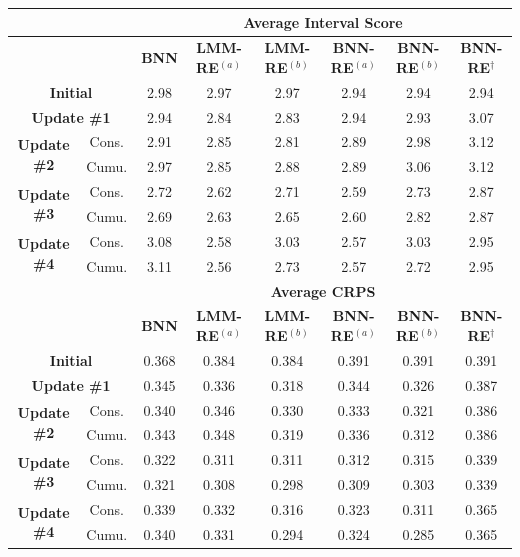 \begin{tabular}{cc|cccccc}
\hline
 & & \multicolumn{6}{c}{\textbf{Average Interval Score}} \\
\hline
 & & \textbf{BNN} & \textbf{LMM-RE}$^{(a)}$ & \textbf{LMM-RE}$^{(b)}$ & \textbf{BNN-RE}$^{(a)}$ & \textbf{BNN-RE}$^{(b)}$ & \textbf{BNN-RE}$^{\dagger}$ \\
\hline
\multicolumn{2}{c|}{\textbf{Initial}} & 2.98 & 2.97 & 2.97 & 2.94 & 2.94 & 2.94 \\
\multicolumn{2}{c|}{\textbf{Update \#1}} & 2.94 & 2.84 & 2.83 & 2.94 & 2.93 & 3.07 \\
\multirow{2}{*}{\textbf{Update \#2}} & Cons. & 2.91 & 2.85 & 2.81 & 2.89 & 2.98 & 3.12 \\
 & Cumu. & 2.97 & 2.85 & 2.88 & 2.89 & 3.06 & 3.12 \\
\multirow{2}{*}{\textbf{Update \#3}} & Cons. & 2.72 & 2.62 & 2.71 & 2.59 & 2.73 & 2.87 \\
 & Cumu. & 2.69 & 2.63 & 2.65 & 2.60 & 2.82 & 2.87 \\
\multirow{2}{*}{\textbf{Update \#4}} & Cons. & 3.08 & 2.58 & 3.03 & 2.57 & 3.03 & 2.95 \\
 & Cumu. & 3.11 & 2.56 & 2.73 & 2.57 & 2.72 & 2.95 \\
\hline
 & & \multicolumn{6}{c}{\textbf{Average CRPS}} \\
\hline
 & & \textbf{BNN} & \textbf{LMM-RE}$^{(a)}$ & \textbf{LMM-RE}$^{(b)}$ & \textbf{BNN-RE}$^{(a)}$ & \textbf{BNN-RE}$^{(b)}$ & \textbf{BNN-RE}$^{\dagger}$ \\
\hline
\multicolumn{2}{c|}{\textbf{Initial}} & 0.368 & 0.384 & 0.384 & 0.391 & 0.391 & 0.391 \\
\multicolumn{2}{c|}{\textbf{Update \#1}} & 0.345 & 0.336 & 0.318 & 0.344 & 0.326 & 0.387 \\
\multirow{2}{*}{\textbf{Update \#2}} & Cons. & 0.340 & 0.346 & 0.330 & 0.333 & 0.321 & 0.386 \\
 & Cumu. & 0.343 & 0.348 & 0.319 & 0.336 & 0.312 & 0.386 \\
\multirow{2}{*}{\textbf{Update \#3}} & Cons. & 0.322 & 0.311 & 0.311 & 0.312 & 0.315 & 0.339 \\
 & Cumu. & 0.321 & 0.308 & 0.298 & 0.309 & 0.303 & 0.339 \\
\multirow{2}{*}{\textbf{Update \#4}} & Cons. & 0.339 & 0.332 & 0.316 & 0.323 & 0.311 & 0.365 \\
 & Cumu. & 0.340 & 0.331 & 0.294 & 0.324 & 0.285 & 0.365 \\
\hline
\end{tabular}